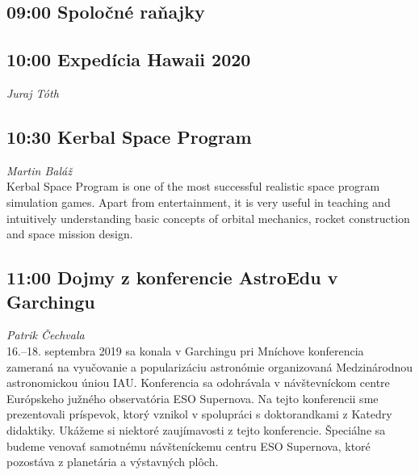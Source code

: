 \documentclass[a4paper]{report}
\begin{document}
                                    \begin{tcolorbox}
                            \subsection{09:00 \hfill Spoločné raňajky}
                                                            \end{tcolorbox}
                                                \begin{tcolorbox}
                            \subsection{10:00 \hfill Expedícia Hawaii 2020}
                                    \hfill \textit{Juraj Tóth} \\
                                                            \end{tcolorbox}
                                                \begin{tcolorbox}
                            \subsection{10:30 \hfill Kerbal Space Program}
                                    \hfill \textit{Martin Baláž} \\
                                                    Kerbal Space Program is one of the most successful realistic space program simulation games. Apart from entertainment, it is very useful in teaching and intuitively understanding basic concepts of orbital mechanics, rocket construction and space mission design.

                                            \end{tcolorbox}
                                                \begin{tcolorbox}
                            \subsection{11:00 \hfill Dojmy z konferencie AstroEdu v Garchingu}
                                    \hfill \textit{Patrik Čechvala} \\
                                                    16.--18. septembra 2019 sa konala v Garchingu pri Mníchove konferencia zameraná na vyučovanie a popularizáciu astronómie organizovaná Medzinárodnou astronomickou úniou IAU. Konferencia sa odohrávala v návštevníckom centre Európskeho južného observatória ESO Supernova. Na tejto konferencii sme prezentovali príspevok, ktorý vznikol v spolupráci s doktorandkami z Katedry didaktiky. Ukážeme si niektoré zaujímavosti z tejto konferencie. Špeciálne sa budeme venovať samotnému návšteníckemu centru ESO Supernova, ktoré pozostáva z planetária a výstavných plôch.

                                            \end{tcolorbox}
\end{document}
